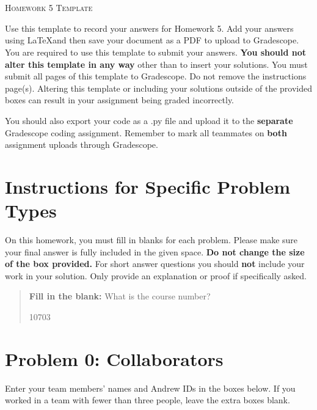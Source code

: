 \documentclass[12pt]{article}
\begin{document}
\section*{}
\begin{center}
  \centerline{\textsc{\LARGE  Homework 5 Template}}
\end{center}

Use this template to record your answers for Homework 5.  Add your answers using \LaTeX and then save your document as a PDF to upload to Gradescope.  You are required to use this template to submit your answers.  \textbf{You should not alter this template in any way} other than to insert your solutions.  You must submit all \pageref{LastPage} pages of this template to Gradescope.  Do not remove the instructions page(s).  Altering this template or including your solutions outside of the provided boxes can result in your assignment being graded incorrectly.

You should also export your code as a .py file and upload it to the \textbf{separate} Gradescope coding assignment. Remember to mark all teammates on \textbf{both} assignment uploads through Gradescope.

\section*{Instructions for Specific Problem Types}

On this homework, you must fill in blanks for each problem. Please make sure your final answer is fully included in the given space.  \textbf{Do not change the size of the box provided.}  For short answer questions you should \textbf{not} include your work in your solution.  Only provide an explanation or proof if specifically asked.

\begin{quote}
\textbf{Fill in the blank:} What is the course number?

\begin{tcolorbox}[fit,height=1cm, width=4cm, blank, borderline={1pt}{-2pt},nobeforeafter]
    \begin{center}\huge10703\end{center}
    \end{tcolorbox}
\end{quote}

\newpage

\section*{Problem 0: Collaborators}
Enter your team members' names and Andrew IDs in the boxes below. If you worked in a team with fewer than three people, leave the extra boxes blank.
\end{document}
